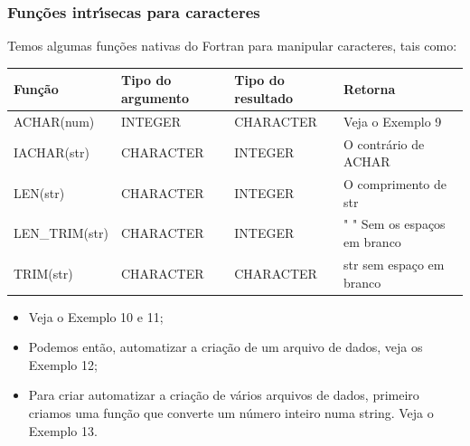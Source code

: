 \documentclass[xcolor=table]{beamer}
\newenvironment{stepitemize}{\begin{itemize}[<+->]}{\end{itemize} }
\begin{document}
\begin{frame}%

\frametitle{Fun\c{c}\~{o}es intr\'{\i}secas para caracteres}

Temos algumas fun\c{c}\~{o}es nativas do Fortran para manipular caracteres,
tais como:
\begin{table}
	\begin{center}
		\begin{adjustbox}{max width=1.\textwidth}
			\begin{tabular}{llll}
				\rowcolor{Maroon}
				Fun\c{c}\~{a}o & Tipo do argumento & Tipo do resultado & Retorna \\ 
				\hline
				\rowcolor{Maroon!50}
				ACHAR(num) & INTEGER & CHARACTER & Veja o Exemplo 9 \\
				\rowcolor{Maroon!20} 
				IACHAR(str) & CHARACTER & INTEGER & O contr\'{a}rio de ACHAR \\  
				\rowcolor{Maroon!50}
				LEN(str) & CHARACTER & INTEGER & O comprimento de str \\ 
				\rowcolor{Maroon!20} 
				LEN\_TRIM(str) & CHARACTER & INTEGER & " " Sem os espa\c{c}os em branco \\ 
				\rowcolor{Maroon!50}
				TRIM(str) & CHARACTER & CHARACTER & str sem espa\c{c}o em branco%
			\end{tabular}
		\end{adjustbox}
	\end{center}
\end{table}

\begin{stepitemize}
\item Veja o Exemplo 10 e 11;

\item Podemos ent\~{a}o, automatizar a cria\c{c}\~{a}o de um arquivo de
dados, veja os Exemplo 12;

\item Para criar automatizar a cria\c{c}\~{a}o de v\'{a}rios arquivos de
dados, primeiro criamos uma fun\c{c}\~{a}o que converte um n\'{u}mero
inteiro numa string. Veja o Exemplo 13.
\end{stepitemize}

\transboxout%
\end{frame}%
\end{document}
